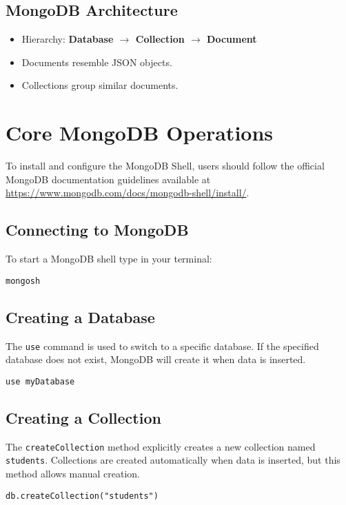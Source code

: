 \documentclass{article}
\begin{document}
\subsection{MongoDB Architecture}
\begin{itemize}
    \item Hierarchy: \textbf{Database $\rightarrow$ Collection $\rightarrow$ Document}
    \item Documents resemble JSON objects.
    \item Collections group similar documents.
\end{itemize}

\section{Core MongoDB Operations}
To install and configure the MongoDB Shell, users should follow the official MongoDB documentation guidelines available at \url{https://www.mongodb.com/docs/mongodb-shell/install/}.

\subsection{Connecting to MongoDB}
To start a MongoDB shell type in your terminal:

\begin{verbatim}
mongosh
\end{verbatim}

\subsection{Creating a Database}
The \texttt{use} command is used to switch to a specific database. If the specified database does not exist, MongoDB will create it when data is inserted.
\begin{verbatim}
use myDatabase
\end{verbatim}

\subsection{Creating a Collection}
The \texttt{createCollection} method explicitly creates a new collection named \texttt{students}. Collections are created automatically when data is inserted, but this method allows manual creation.
\begin{verbatim}
db.createCollection("students")
\end{verbatim}
\end{document}

